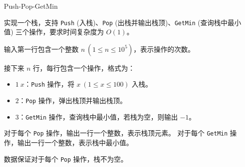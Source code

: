 Push-Pop-GetMin

实现一个栈，支持 \texttt{Push} (入栈)、\texttt{Pop} (出栈并输出栈顶)、\texttt{GetMin} (查询栈中最小值) 三个操作，要求时间复杂度为 $O(1)$。

输入第一行包含一个整数 $n \ (1 \leq n \leq 10^5)$，表示操作的次数。

接下来 $n$ 行，每行包含一个操作，格式为：
\begin{itemize}
    \item $1 \ x$：\texttt{Push} 操作，将 $x \ (1 \le x \le 100)$ 入栈。
    \item $2$：\texttt{Pop} 操作，弹出栈顶并输出栈顶。
    \item $3$：\texttt{GetMin} 操作，查询栈中最小值，若栈为空，则输出 $-1$。
\end{itemize}

对于每个 \texttt{Pop} 操作，输出一行一个整数，表示栈顶元素。
对于每个 \texttt{GetMin} 操作，输出一行一个整数，表示栈中最小值。

数据保证对于每个 \texttt{Pop} 操作，栈不为空。